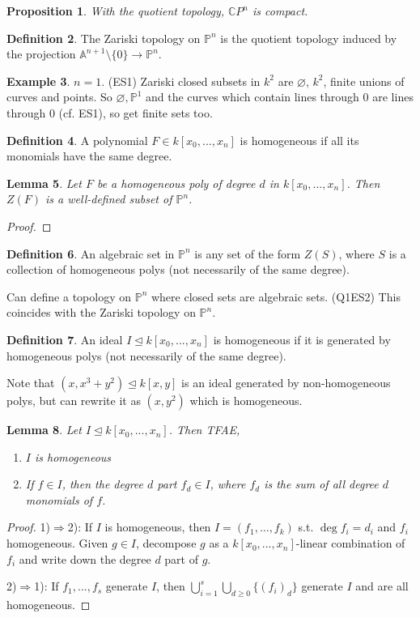 \documentclass{article}
\theoremstyle{definition}
\newtheorem{defn}{Definition}[section]
\newtheorem{example}[defn]{Example}
\theoremstyle{remark}
\theoremstyle{plain}
\newtheorem{lem}[defn]{Lemma}
\newtheorem{prop}[defn]{Proposition}
\newcommand{\CC}{\mathbb{C}}
\newcommand{\PP}{\mathbb{P}}
\newcommand{\bA}{\mathbb{A}}
\begin{document}
\begin{prop}
    With the quotient topology, $\CC P^n$ is compact.
\end{prop}
\begin{defn}
    The Zariski topology on $\PP^n$ is the quotient topology induced by the projection $\bA^{n+1}\setminus\{0\}\to \PP^n$.
\end{defn}
\begin{example}
    $n=1$. (ES1) Zariski closed subsets in $k^2$ are $\varnothing$, $k^2$, finite unions of curves and points. So $\varnothing,\PP^1$ and the curves which contain lines through $0$ are lines through $0$ (cf. ES1), so get finite sets too.
\end{example}
\begin{defn}
    A polynomial $F\in k[x_0,...,x_n]$ is homogeneous if all its monomials have the same degree.
\end{defn}
\begin{lem}
    Let $F$ be a homogeneous poly of degree $d$ in $k[x_0,...,x_n]$. Then $Z(F)$ is a well-defined subset of $\PP^n$.
\end{lem}
\begin{proof}
    
\end{proof}
\begin{defn}
    An algebraic set in $\PP^n$ is any set of the form $Z(S)$, where $S$ is a collection of homogeneous polys (not necessarily of the same degree).
\end{defn}
Can define a topology on $\PP^n$ where closed sets are algebraic sets. (Q1ES2) This coincides with the Zariski topology on $\PP^n$.
\begin{defn}
    An ideal $I\trianglelefteq k[x_0,...,x_n]$ is homogeneous if it is  generated by homogeneous polys (not necessarily of the same degree).
\end{defn}
Note that $(x,x^3+y^2)\trianglelefteq k[x,y]$ is an ideal generated by non-homogeneous polys, but can rewrite it as $(x,y^2)$ which is homogeneous.
\begin{lem}
    Let $I\trianglelefteq k[x_0,...,x_n]$. Then TFAE,
    \begin{enumerate}[1)]
        \item $I$ is homogeneous
        \item If $f\in I$, then the degree $d$ part $f_d\in I$, where $f_d$ is the sum of all degree $d$ monomials of $f$.
    \end{enumerate}
\end{lem}
\begin{proof}
    1)$\Rightarrow$2): If $I$ is homogeneous, then $I=(f_1,...,f_k)$ s.t. $\deg f_i=d_i$ and $f_i$ homogeneous. Given $g\in I$, decompose $g$ as a $k[x_0,...,x_n]$-linear combination of $f_i$ and write down the degree $d$ part of $g$.

    2)$\Rightarrow$1): If $f_1,...,f_s$ generate $I$, then $\bigcup_{i=1}^s\bigcup_{d\ge 0}\{(f_i)_d\}$ generate $I$ and are all homogeneous. 
\end{proof}
\end{document}
